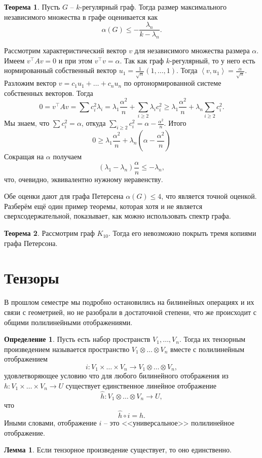 \documentclass[10pt,a4paper,oneside]{book}
\theoremstyle{definition}
\newtheorem*{defn}{Определение}
\newtheorem{thm}{Теорема}
\newtheorem{lem}{Лемма}
\def\lan{\left\langle }
\def\ran{\right\rangle}
\def\thrm{\begin{thm}}
\def\ethrm{\end{thm}}
\def\dfn{\begin{defn}}
\def\edfn{\end{defn}}
\def\lm{\begin{lem}}
\def\elm{\end{lem}}
\begin{document}
\thrm Пусть $G$ -- $k$-регулярный граф. Тогда размер максимального независимого множества в графе оценивается как $$\alpha(G)\leq -\frac{\lambda_n}{k-\lambda_n}.$$
\ethrm
\proof Рассмотрим характеристический вектор $v$ для независимого множества размера $\alpha$. Имеем $v^{\top}Av=0$ и при этом $v^{\top}v=\alpha$. Так как граф $k$-регулярный, то у него есть нормированный собственный вектор $u_1=\frac{1}{\sqrt{n}}(1,\dots,1)$. Тогда $\lan v,u_1\ran = \frac{\alpha}{\sqrt{n}}$. Разложим вектор $v=c_1u_1 + \dots + c_n u_n$ по ортонормированной системе собственных векторов. Тогда
$$0=v^{\top}Av=\sum c_i^2 \lambda_i= \lambda_1\frac{\alpha^2}{n}+ \sum_{i\geq 2} \lambda_i c_i^2\geq \lambda_1\frac{\alpha^2}{n}+ \lambda_n \sum_{i\geq 2} c_i^2.$$
Мы знаем, что $\sum c_i^2=\alpha$, откуда $\sum_{i\geq 2} c_i^2=\alpha - \frac{\alpha^2}{n}$. Итого 
$$0\geq \lambda_1\frac{\alpha^2}{n}+\lambda_n(\alpha- \frac{\alpha^2}{n})$$
Сокращая на $\alpha$ получаем 
$$(\lambda_1-\lambda_n)\frac{\alpha}{n}\leq -\lambda_n,$$
что, очевидно, эквивалентно нужному неравенству.
\endproof

Обе оценки дают для графа Петерсена $\alpha(G)\leq 4$, что является точной оценкой. Разберём ещё один пример теоремы, которая хотя и не является сверхсодержательной, показывает, как можно использовать спектр графа.

\thrm Рассмотрим граф $K_{10}$. Тогда его невозможно покрыть тремя копиями графа Петерсона.
\ethrm

\section{Тензоры}

В прошлом семестре мы подробно остановились на билинейных операциях и их связи с геометрией, но не разобрали в достаточной степени, что же происходит с общими полилинейными отображениями.

\dfn Пусть есть набор пространств $V_1, \dots,V_n$. Тогда их тензорным произведением называется пространство 
$V_1\otimes \dots \otimes V_n$ вместе с полилинейным отображением
$$i \colon V_1 \times \dots \times V_n \to V_1 \otimes \dots \otimes V_n,$$
удовлетворяющее условию что для любого билинейного отображения из $h\colon V_1\times \dots \times V_n \to U$ существует единственное линейное отображение 
$$\hat{h}\colon V_1\otimes \dots \otimes V_n \to U,$$
что 
$$\hat{h}\circ i=h.$$
Иными словами, отображение $i$ -- это <<универсальное>> полилинейное отображение.
\edfn 


\lm Если тензорное произведение существует, то оно единственно.
\elm
\end{document}
